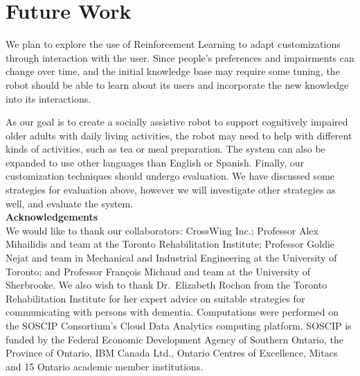 \documentclass[11pt,a4paper, final, twoside]{article}
\theoremstyle{proposition}
\theoremstyle{definition}
\theoremstyle{remark}
\numberwithin{equation}{section}
\begin{document}

\section{Future Work}
We plan to explore the use of Reinforcement Learning to adapt customizations through interaction with the user. Since people's preferences and impairments can change over time, and the initial knowledge base may require some tuning, the robot should be able to learn about its users and incorporate the new knowledge into its interactions.

As our goal is to create a socially assistive robot to support cognitively impaired older adults with daily living activities, the robot may need to help with different kinds of activities, such as tea or meal preparation.
The system can also be expanded to use other languages than English or Spanish.
Finally, our customization techniques should undergo evaluation. We have discussed some strategies for evaluation above, however we will investigate other strategies as well, and evaluate the system.\\


\noindent \textbf{Acknowledgements}\\

\noindent We would like to thank our collaborators: CrossWing Inc.; Professor Alex Mihailidis and team at the Toronto Rehabilitation Institute; Professor Goldie Nejat and team in Mechanical and Industrial Engineering at the University of Toronto; and Professor Fran\c{c}ois Michaud and team at the University of Sherbrooke.  We also wish to thank Dr.~Elizabeth Rochon from the Toronto Rehabilitation Institute for her expert advice on suitable strategies for communicating with persons with dementia.
Computations were performed on the SOSCIP Consortium's Cloud Data Analytics computing platform. SOSCIP is funded by the Federal Economic Development Agency of Southern Ontario, the Province of Ontario, IBM Canada Ltd., Ontario Centres of Excellence, Mitacs and 15 Ontario academic member institutions.




\end{document}
